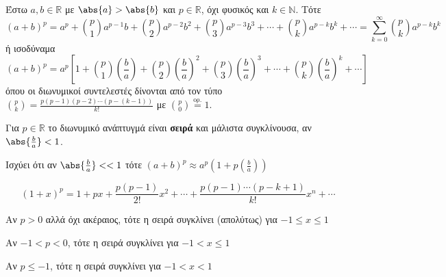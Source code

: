 Έστω $ a,b \in \mathbb{R} $ με $ \abs{a} > \abs{b} $ και $ p \in \mathbb{R} $, όχι
φυσικός και $ k \in \mathbb{N} $. Τότε
\[
  \boxed{(a+b)^{p} = a^{p} + \binom{p}{1} a^{p-1}b + \binom{p}{2} a^{p-2}b^{2} +
    \binom{p}{3} a^{p-3}b^{3} + \cdots + \binom{p}{k} a^{p-k}b^{k} + \cdots =
  \sum_{k=0}^{\infty} \binom{p}{k} a^{p-k}b^{k}}
\] 
ή ισοδύναμα
\[
  (a+b)^{p} = a^{p}\left[1 + \binom{p}{1} \left(\frac{b}{a}\right)+ \binom{p}{2} 
    \left(\frac{b}{a}\right)^{2}+ \binom{p}{3} \left(\frac{b}{ a}\right)^{3}+ \cdots + 
  \binom{p}{k} \left(\frac{b}{a}\right)^{k}+ \cdots\right]
\] 
όπου οι διωνυμικοί συντελεστές δίνονται από τον τύπο
$
\binom{p}{k} = \frac{p(p-1)(p-2)\cdots (p-(k-1))}{k!} 
$ με $ \binom{p}{0} \overset{\text{ορ.}}{=} 1 $.
\begin{rem}
\item {}
  Για $ p \in \mathbb{R} $ το διωνυμικό ανάπτυγμά είναι \textbf{σειρά}
  και μάλιστα συγκλίνουσα, αν $ \abs{\frac{b}{a}} < 1 $. 

  Ισχύει ότι αν $ \abs{\frac{b}{a}} < < 1  $ τότε  
  $ (a+b)^{p} \approx a^{p}\left(1+p\left(\frac{b}{a}\right)\right)  $ 
\end{rem}
\[
  (1+x)^p = 1 + px + \frac{p(p-1)}{2!} x^2 + \cdots + \frac{p(p-1)\cdots (p-k+1)}{k!}
  x^n + \cdots   
\] 
\begin{rem}
\item {}
  \begin{myitemize}
    \item Αν $ p>0 $ αλλά όχι ακέραιος, τότε η σειρά συγκλίνει (απολύτως) για $ -1 \leq x
      \leq 1 $
    \item Αν $-1<p<0$, τότε η σειρά συγκλίνει για $ -1 < x \leq 1 $
    \item Αν $p \leq -1$, τότε η σειρά συγκλίνει για $ -1 < x < 1 $
  \end{myitemize}
\end{rem}





